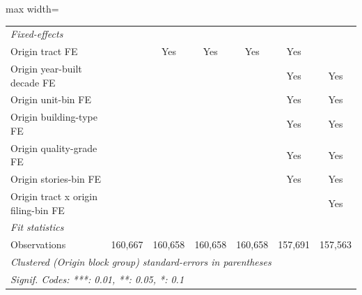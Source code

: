 \documentclass[
  11pt,
]{article}
\begin{document}
\begin{adjustbox}{max width=\textwidth}
\begin{tabular}{lcccccc}
   \midrule
   \emph{Fixed-effects}\\
   Origin tract FE                                 &                        & Yes      & Yes      & Yes            & Yes            & \\  
   Origin year-built decade FE                     &                        &          &          &                & Yes            & Yes\\  
   Origin unit-bin FE                              &                        &          &          &                & Yes            & Yes\\  
   Origin building-type FE                         &                        &          &          &                & Yes            & Yes\\  
   Origin quality-grade FE                         &                        &          &          &                & Yes            & Yes\\  
   Origin stories-bin FE                           &                        &          &          &                & Yes            & Yes\\  
   Origin tract x origin filing-bin FE             &                        &          &          &                &                & Yes\\  
   \midrule
   \emph{Fit statistics}\\
   Observations                                    & 160,667                & 160,658  & 160,658  & 160,658        & 157,691        & 157,563\\  
   \midrule \midrule
   \multicolumn{7}{l}{\emph{Clustered (Origin block group) standard-errors in parentheses}}\\
   \multicolumn{7}{l}{\emph{Signif. Codes: ***: 0.01, **: 0.05, *: 0.1}}\\
\end{tabular}
\par\endgroup

\end{adjustbox}
\end{document}
